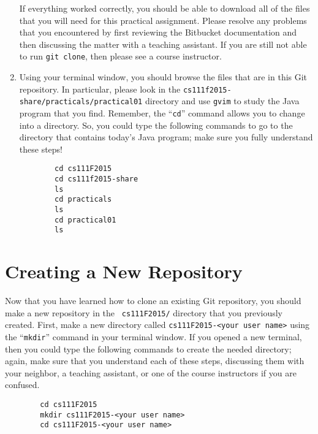 \begin{enumerate}
    If everything worked correctly, you should be able to download all of the files that you will need for this
    practical assignment. Please resolve any problems that you encountered by first reviewing the Bitbucket
    documentation and then discussing the matter with a teaching assistant.  If you are still not able to run {\tt git
      clone}, then please see a course instructor.

  \item Using your terminal window, you should browse the files that are in this Git repository.  In particular, please
    look in the {\tt cs111f2015-share/practicals/practical01} directory and use {\tt gvim} to study the Java program that
    you find.  Remember, the ``{\tt cd}'' command allows you to change into a directory. So, you could type the following
    commands to go to the directory that contains today's Java program; make sure you fully understand these steps!

    \vspace*{-.1in}
    \begin{verbatim}
        cd cs111F2015
        cd cs111f2015-share
        ls
        cd practicals
        ls
        cd practical01
        ls
    \end{verbatim}
    \vspace*{-.5in}

    \end{enumerate}

\section*{Creating a New Repository}

Now that you have learned how to clone an existing Git repository, you should make a new repository in the {\tt
  cs111F2015/} directory that you previously created.  First, make a new directory called {\tt cs111F2015-<your user
  name>} using the ``{\tt mkdir}'' command in your terminal window. If you opened a new terminal, then you could type
the following commands to create the needed directory; again, make sure that you understand each of these steps,
discussing them with your neighbor, a teaching assistant, or one of the course instructors if you are confused.

    \vspace*{-.1in}
    \begin{verbatim}
        cd cs111F2015
        mkdir cs111F2015-<your user name>
        cd cs111F2015-<your user name>
    \end{verbatim}
    \vspace*{-.1in}


